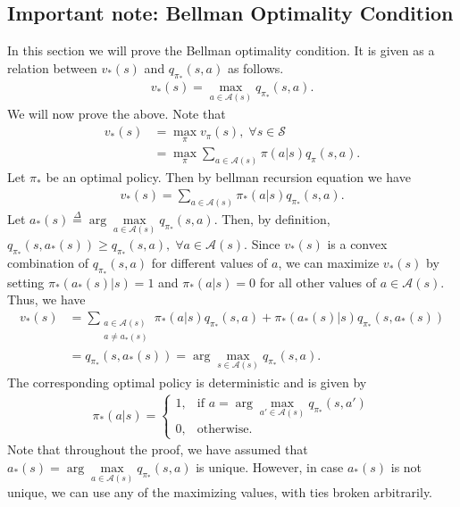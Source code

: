 \documentclass[10pt]{article}
\newcommand{\ldef}{\stackrel{\Delta}{=}}
\begin{document}
	\subsection*{Important note: Bellman Optimality Condition}
	\label{ss:bell-op-con}
	In this section we will prove the Bellman optimality condition. It is given as a relation between $v_*(s)$ and $q_{\pi_*}(s,a)$ as follows.
	\begin{align*}
	v_*(s) = \max\limits_{a\in\mathcal{A}(s)} q_{\pi_*}(s,a).
	\end{align*}
	We will now prove the above. Note that
	\begin{align*}
	v_*(s) &= \max\limits_\pi v_\pi (s), \;\forall s \in \mathcal{S}\\
	&= \max\limits_\pi \sum_{a\in\mathcal{A}(s)} \pi(a|s) q_\pi(s,a).
	\end{align*}
	Let $\pi_*$ be an optimal policy. Then by bellman recursion equation we have
	\begin{align*}
	v_*(s) = \sum_{a\in\mathcal{A}(s)} \pi_*(a|s)q_{\pi_*}(s,a).
	\end{align*}
	Let $a_*(s) \ldef \arg\max\limits_{a\in\mathcal{A}(s)} q_{\pi_*}(s,a)$. Then, by definition, $q_{\pi_*}(s,a_*(s)) \geq q_{\pi_*}(s,a), \; \forall a\in\mathcal{A}(s)$. Since $v_*(s)$ is a convex combination of $q_{\pi_*}(s,a)$ for different values of $a$, we can maximize $v_*(s)$ by setting $\pi_*(a_*(s)|s)=1$ and $\pi_*(a|s) =0$ for all other values of $a\in\mathcal{A}(s)$. Thus, we have
	\begin{align*}
	v_*(s) &= \sum_{\substack{a\in\mathcal{A}(s)\\ a\neq a_*(s)}} \pi_*(a|s)q_{\pi_*}(s,a) + \pi_*(a_*(s)|s) q_{\pi_*}(s,a_*(s))\\
	&=q_{\pi_*}(s,a_*(s)) = \arg\max\limits_{s\in\mathcal{A}(s)} q_{\pi_*}(s,a).
	\end{align*} 
	The corresponding optimal policy is deterministic and is given by
	\begin{align*}
	\pi_*(a|s) = 
	\begin{cases}
	1,& \text{if } a = \displaystyle\arg\max_{a'\in\mathcal{A}(s)} q_{\pi_*}(s,a')\\
	0,& \text{otherwise.}
	\end{cases}
	\end{align*}
	Note that throughout the proof, we have assumed that $a_*(s) = \arg\max\limits_{a\in\mathcal{A}(s)}q_{\pi_*}(s,a)$ is unique. However, in case $a_*(s)$ is not unique, we can use any of the maximizing values, with ties broken arbitrarily.
\end{document}
